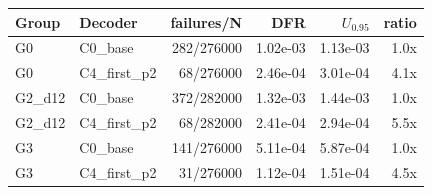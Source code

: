 \begin{tabular}{llrrrr}
\toprule
Group & Decoder & failures/N & DFR & $U_{0.95}$ & ratio \\
\midrule
G0 & C0_base & 282/276000 & 1.02e-03 & 1.13e-03 & 1.0x \\
G0 & C4_first_p2 & 68/276000 & 2.46e-04 & 3.01e-04 & 4.1x \\
G2_d12 & C0_base & 372/282000 & 1.32e-03 & 1.44e-03 & 1.0x \\
G2_d12 & C4_first_p2 & 68/282000 & 2.41e-04 & 2.94e-04 & 5.5x \\
G3 & C0_base & 141/276000 & 5.11e-04 & 5.87e-04 & 1.0x \\
G3 & C4_first_p2 & 31/276000 & 1.12e-04 & 1.51e-04 & 4.5x \\
\bottomrule
\end{tabular}